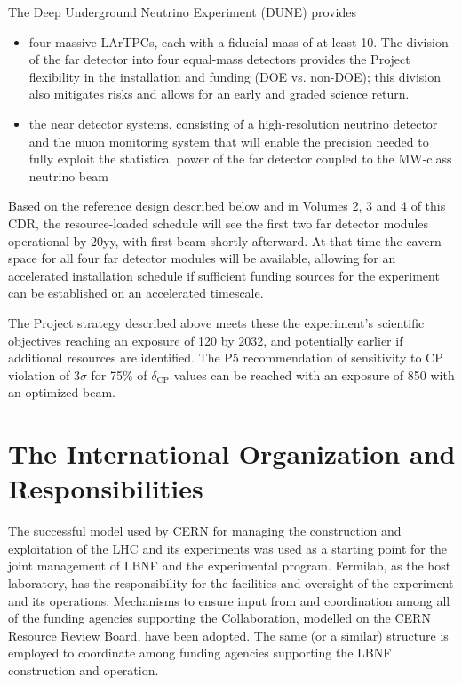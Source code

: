 The Deep Underground Neutrino Experiment (DUNE) provides
\begin{itemize}

\item four massive LArTPCs, each with a fiducial mass of at least \SI{10}{\kt}. The division of 
the far detector into four equal-mass detectors provides the Project flexibility 
in the installation and funding (DOE vs. non-DOE); this division also mitigates risks and allows for an early and graded science return.

\item the near detector systems, consisting of a high-resolution neutrino detector 
and the muon monitoring system that will enable %
the precision %
needed to fully 
exploit the statistical power of the %
far detector coupled to the %
MW-class 
neutrino beam
\end{itemize}


Based on the reference design described below and in Volumes 2, 3 and 4 of this %
CDR, the resource-loaded schedule will see the first two  far detector modules 
operational by 20yy, %
with first beam shortly afterward. At that time the cavern 
space for all four  far detector modules will be available, allowing for 
an accelerated installation schedule if sufficient funding sources for
the experiment can be established on an accelerated timescale.  

\vspace{6pt}
The Project strategy described above meets these the experiment's scientific objectives
 reaching an exposure of 
\num{120}\ktMWyr{} by 2032, and potentially earlier if additional resources are identified. 
The P5 recommendation of sensitivity to CP violation of 3$\sigma$ for 75\% of $\delta_\text{CP}$
values can be reached with an exposure of \num{850}\ktMWyr{} with an optimized beam.

\section{The International Organization and Responsibilities}

The successful model used by CERN for managing the construction and exploitation of the LHC and its experiments was used as a starting point for the joint management of LBNF and the experimental program.  Fermilab, as the host laboratory, has the responsibility for the facilities and oversight of the experiment and its operations.  Mechanisms to ensure input from and coordination among all of the funding agencies supporting the Collaboration, modelled on the CERN Resource Review Board, have been adopted. The same (or a similar) structure is employed to coordinate among funding agencies supporting the LBNF construction and operation.  

